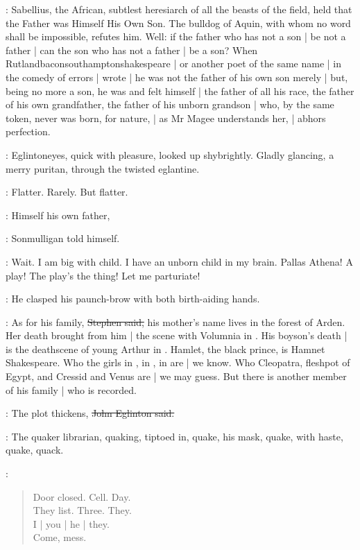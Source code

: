 \Stephen:
Sabellius, the African,
subtlest heresiarch of all the beasts of the field,
held that the Father was Himself His Own Son.
The bulldog of Aquin,
with whom no word shall be impossible,
refutes him.
Well:
if the father who has not a son |
be not a father |
can the son who has not a father |
be a son?
When Rutlandbaconsouthamptonshakespeare |
or another poet of the same name |
in the comedy of errors |
wrote  |
he was not the father of his own son merely |
but, being no more a son,
he was and felt himself |
the father of all his race,
the father of his own grandfather,
the father of his unborn grandson |
who, by the same token,
never was born,
for nature, |
as Mr Magee understands her, |
abhors perfection.

:
Eglintoneyes,
quick with pleasure,
looked up shybrightly.
Gladly glancing,
a merry puritan,
through the twisted eglantine.

\StephenInt:
Flatter.
Rarely.
But flatter.

\mulligan:
Himself his own father,

:
Sonmulligan told himself.

\mulligan:
Wait.
I am big with child.
I have an unborn child in my brain.
Pallas Athena!
A play!
The play's the thing!
Let me parturiate!

:
He clasped his paunch-brow with both birth-aiding hands.

\Stephen:
As for his family,
\sout{Stephen said,}
his mother's name lives in the forest of Arden.
Her death brought from him |
the scene with Volumnia in .
His boyson's death |
is the deathscene of young Arthur in .
Hamlet, the black prince,
is Hamnet Shakespeare.
Who the girls in ,
in ,
in  are |
we know.
Who Cleopatra,
fleshpot of Egypt,
and Cressid and Venus are |
we may guess.
But there is another member of his family |
who is recorded.

\eglinton:
The plot thickens,
\sout{John Eglinton said.}

:
The quaker librarian,
quaking,
tiptoed in,
quake,
his mask,
quake,
with haste,
quake,
quack.

\StephenInt:
\begin{verse}
    Door closed. Cell. Day.\\
    They list. Three. They.
 \\
    I | you | he | they.\\
    Come, mess.
\end{verse}

